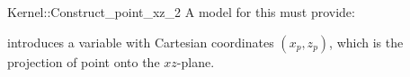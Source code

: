\begin{ccRefFunctionObjectConcept}{Kernel::Construct_point_xz_2}
A model for this must provide:



            {introduces a variable with Cartesian coordinates $(x_p, z_p)$, 
             which is the projection of point  onto the $xz$-plane.}

\end{ccRefFunctionObjectConcept}
